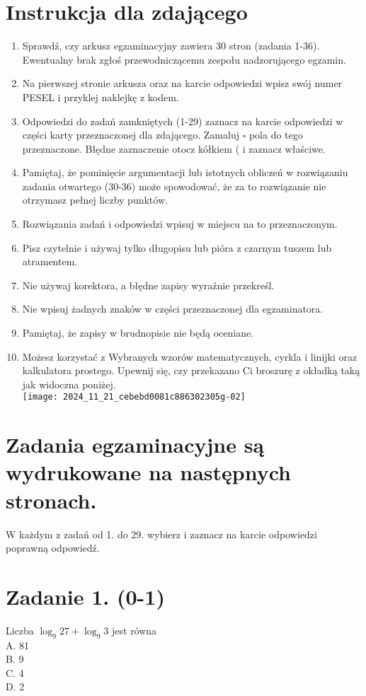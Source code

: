 \documentclass[10pt]{article}
\begin{document}
\section*{Instrukcja dla zdającego}
\begin{enumerate}
  \item Sprawdź, czy arkusz egzaminacyjny zawiera 30 stron (zadania 1-36). Ewentualny brak zgłoś przewodniczącemu zespołu nadzorującego egzamin.
  \item Na pierwszej stronie arkusza oraz na karcie odpowiedzi wpisz swój numer PESEL i przyklej naklejkę z kodem.
  \item Odpowiedzi do zadań zamkniętych (1-29) zaznacz na karcie odpowiedzi w części karty przeznaczonej dla zdającego. Zamaluj \(\square\) pola do tego przeznaczone. Błędne zaznaczenie otocz kółkiem ( i zaznacz właściwe.
  \item Pamiętaj, że pominięcie argumentacji lub istotnych obliczeń w rozwiązaniu zadania otwartego (30-36) może spowodować, że za to rozwiązanie nie otrzymasz pełnej liczby punktów.
  \item Rozwiązania zadań i odpowiedzi wpisuj w miejscu na to przeznaczonym.
  \item Pisz czytelnie i używaj tylko długopisu lub pióra z czarnym tuszem lub atramentem.
  \item Nie używaj korektora, a błędne zapisy wyraźnie przekreśl.
  \item Nie wpisuj żadnych znaków w części przeznaczonej dla egzaminatora.
  \item Pamiętaj, że zapisy w brudnopisie nie będą oceniane.
  \item Możesz korzystać z Wybranych wzorów matematycznych, cyrkla i linijki oraz kalkulatora prostego. Upewnij się, czy przekazano Ci broszurę z okładką taką jak widoczna poniżej.\\
\texttt{[image: 2024\_11\_21\_cebebd0081c886302305g-02]}
\end{enumerate}

\section*{Zadania egzaminacyjne są wydrukowane na następnych stronach.}
W każdym z zadań od 1. do 29. wybierz i zaznacz na karcie odpowiedzi poprawną odpowiedź.

\section*{Zadanie 1. (0-1)}
Liczba \(\log _{9} 27+\log _{9} 3\) jest równa\\
A. 81\\
B. 9\\
C. 4\\
D. 2
\end{document}
